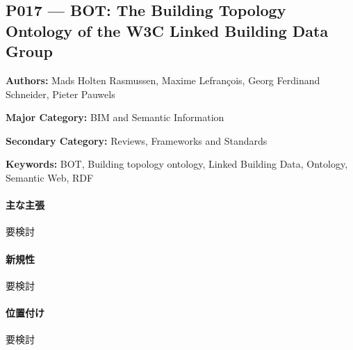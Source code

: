 \subsection{P017 --- BOT: The Building Topology Ontology of the W3C Linked Building Data Group}
\label{paper:P017}
\textbf{Authors:} Mads Holten Rasmussen, Maxime Lefrançois, Georg Ferdinand Schneider, Pieter Pauwels\par
\textbf{Major Category:} BIM and Semantic Information\par
\textbf{Secondary Category:} Reviews, Frameworks and Standards\par
\textbf{Keywords:} BOT, Building topology ontology, Linked Building Data, Ontology, Semantic Web, RDF\par
\paragraph{主な主張}
要検討 \cite{Rasmussen:2021BOT}
\paragraph{新規性}
要検討
\paragraph{位置付け}
要検討
